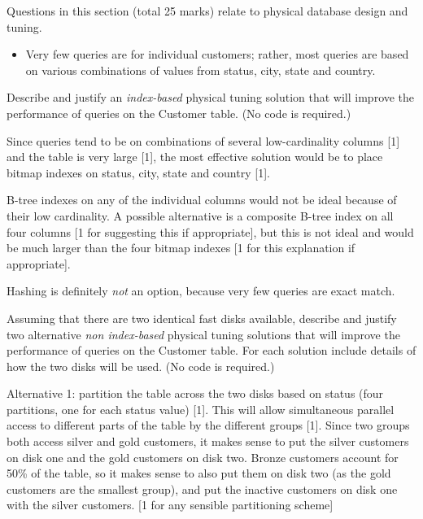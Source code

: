 \begin{examsection}{25}{}{Questions in this section (total 25 marks) relate to
physical database design and tuning.}
\begin{question}{10}
\begin{itemize}
		\item Very few queries are for individual customers; rather, most
		queries are based on various combinations of values from
		\textsf{status}, \textsf{city}, \textsf{state} and \textsf{country}.

	\end{itemize}
	\medskip


	\begin{subquestion}{3}
		Describe and justify an \emph{index-based} physical tuning solution
		that will improve the performance of queries on the \textsf{Customer}
		table. (No code is required.)
		\begin{marking}
			Since queries tend to be on combinations of several low-cardinality
			columns [1] and the table is very large [1], the most effective
			solution would be to place bitmap indexes on status, city, state
			and country [1].

			B-tree indexes on any of the individual columns would not be ideal
			because of their low cardinality. A possible alternative is a
			composite B-tree index on all four columns [1 for suggesting this
			if appropriate], but this is not ideal and would be much larger
			than the four bitmap indexes [1 for this explanation if
			appropriate].

			Hashing is definitely \emph{not} an option, because very few
			queries are exact match.
		\end{marking}
	\end{subquestion}
		

	\begin{subquestion}{7}
		\begin{subsubquestion}{5}
			\label{nonindex}
			Assuming that there are two identical fast disks available,
			describe and justify two alternative \emph{non index-based}
			physical tuning solutions that will improve the performance of
			queries on the \textsf{Customer} table. For each solution include
			details of how the two disks will be used. (No code is required.)
			\begin{marking}
				Alternative 1: partition the table across the two disks based
				on status (four partitions, one for each status value) [1].
				This will allow simultaneous parallel access to different parts
				of the table by the different groups [1]. Since two groups both
				access silver and gold customers, it makes sense to put the
				silver customers on disk one and the gold customers on disk
				two. Bronze customers account for 50\% of the table, so it
				makes sense to also put them on disk two (as the gold customers
				are the smallest group), and put the inactive customers on disk
				one with the silver customers. [1 for any sensible partitioning
				scheme]
	

\end{marking}
\end{subsubquestion}
\end{subquestion}
\end{question}
\end{examsection}
